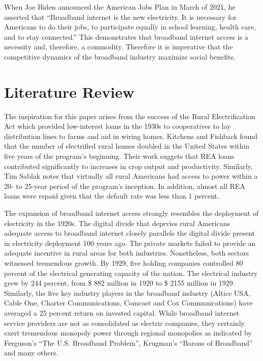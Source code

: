 \documentclass[a4paper,oneside]{article}
\begin{document}
	When Joe Biden announced the American Jobs Plan in March of 2021, he asserted that “Broadband internet is the new electricity. 
	It is necessary for Americans to do their jobs, to participate equally in school learning, health care, and to stay connected.” 
	This demonstrates that broadband internet access is a necessity and, therefore, a commodity. 
	Therefore it is imperative that the competitive dynamics of the broadband industry maximize social benefits.

\section{Literature Review}

\:\:\:\:\:\:The inspiration for this paper arises from the success of the Rural Electrification Act which provided low-interest loans in the 1930s to cooperatives to lay distribution lines to farms and aid in wiring homes. 
Kitchens and Fishback found that the number of electrified rural homes doubled in the United States within five years of the program's beginning. 
Their work suggets that REA loans contributed significantly to increases in crop output and productivity. 
Similarly, Tim Sablak notes that virtually all rural Americans had access to power within a 20- to 25-year period of the program's inception. 
In addition, almost all REA loans were repaid given that the default rate was less than 1 percent.

The expansion of broadband internet access strongly resembles the deployment of electricity in the 1920s.
The digital divide that deprvies rural Americans adequate access to broadband internet closely parallels the digital divide present in electricity deployment 100 years ago.
The private markets failed to provide an adequate incentive in rural areas for both industries. Nonetheless, both sectors witnessed tremendous growth. 
By 1929, five holding companies controlled 80 percent of the electrical generating capacity of the nation. 
The electrical industry grew by 244 percent, from \$ 882 million in 1920 to \$ 2155 million in 1929. 
Similarly, the five key industry players in the broadband industry (Altice USA, Cable One, Charter Communications, Comcast and Cox Communications) have averaged a 25 percent return on invested capital.  
While broadband internet service providers are not as consolidated as electric companies, they certainly exert tremendous monopoly power through regional monopolies as indicated by Ferguson's “The U.S. Broadband Problem”, Krugman's “Barons of Broadband” and many others.
\end{document}
